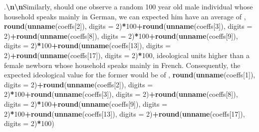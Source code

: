 \documentclass[
]{book}
\newenvironment{Shaded}{\begin{snugshade}}{\end{snugshade}}
\newcommand{\AttributeTok}[1]{\textcolor[rgb]{0.13,0.29,0.53}{#1}}
\newcommand{\DecValTok}[1]{\textcolor[rgb]{0.00,0.00,0.81}{#1}}
\newcommand{\FunctionTok}[1]{\textcolor[rgb]{0.13,0.29,0.53}{\textbf{#1}}}
\newcommand{\NormalTok}[1]{#1}
\newcommand{\SpecialCharTok}[1]{\textcolor[rgb]{0.81,0.36,0.00}{\textbf{#1}}}
\newcommand{\StringTok}[1]{\textcolor[rgb]{0.31,0.60,0.02}{#1}}
\begin{document}
\begin{Shaded}
\begin{Highlighting}[]
\StringTok{\textquotesingle{}.}\SpecialCharTok{\textbackslash{}n\textbackslash{}n}\StringTok{Similarly, should one observe a random 100 year old male individual whose household speaks mainly in German, we can expected him have an average of \textquotesingle{}}\NormalTok{, }\FunctionTok{round}\NormalTok{(}\FunctionTok{unname}\NormalTok{(coeffs[}\DecValTok{2}\NormalTok{]), }\AttributeTok{digits =} \DecValTok{2}\NormalTok{)}\SpecialCharTok{*}\DecValTok{100}\SpecialCharTok{+}\FunctionTok{round}\NormalTok{(}\FunctionTok{unname}\NormalTok{(coeffs[}\DecValTok{3}\NormalTok{]), }\AttributeTok{digits =} \DecValTok{2}\NormalTok{)}\SpecialCharTok{+}\FunctionTok{round}\NormalTok{(}\FunctionTok{unname}\NormalTok{(coeffs[}\DecValTok{8}\NormalTok{]), }\AttributeTok{digits =} \DecValTok{2}\NormalTok{)}\SpecialCharTok{*}\DecValTok{100}\SpecialCharTok{+}\FunctionTok{round}\NormalTok{(}\FunctionTok{unname}\NormalTok{(coeffs[}\DecValTok{9}\NormalTok{]), }\AttributeTok{digits =} \DecValTok{2}\NormalTok{)}\SpecialCharTok{*}\DecValTok{100}\SpecialCharTok{+}\FunctionTok{round}\NormalTok{(}\FunctionTok{unname}\NormalTok{(coeffs[}\DecValTok{13}\NormalTok{]), }\AttributeTok{digits =} \DecValTok{2}\NormalTok{)}\SpecialCharTok{+}\FunctionTok{round}\NormalTok{(}\FunctionTok{unname}\NormalTok{(coeffs[}\DecValTok{17}\NormalTok{]), }\AttributeTok{digits =} \DecValTok{2}\NormalTok{)}\SpecialCharTok{*}\DecValTok{100}\NormalTok{, }\StringTok{\textquotesingle{} ideological units higher than a female newborn whose household speaks mainly in French. Consequently, the expected ideological value for the former would be of \textquotesingle{}}\NormalTok{, }\FunctionTok{round}\NormalTok{(}\FunctionTok{unname}\NormalTok{(coeffs[}\DecValTok{1}\NormalTok{]), }\AttributeTok{digits =} \DecValTok{2}\NormalTok{)}\SpecialCharTok{+}\FunctionTok{round}\NormalTok{(}\FunctionTok{unname}\NormalTok{(coeffs[}\DecValTok{2}\NormalTok{]), }\AttributeTok{digits =} \DecValTok{2}\NormalTok{)}\SpecialCharTok{*}\DecValTok{100}\SpecialCharTok{+}\FunctionTok{round}\NormalTok{(}\FunctionTok{unname}\NormalTok{(coeffs[}\DecValTok{3}\NormalTok{]), }\AttributeTok{digits =} \DecValTok{2}\NormalTok{)}\SpecialCharTok{+}\FunctionTok{round}\NormalTok{(}\FunctionTok{unname}\NormalTok{(coeffs[}\DecValTok{8}\NormalTok{]), }\AttributeTok{digits =} \DecValTok{2}\NormalTok{)}\SpecialCharTok{*}\DecValTok{100}\SpecialCharTok{+}\FunctionTok{round}\NormalTok{(}\FunctionTok{unname}\NormalTok{(coeffs[}\DecValTok{9}\NormalTok{]), }\AttributeTok{digits =} \DecValTok{2}\NormalTok{)}\SpecialCharTok{*}\DecValTok{100}\SpecialCharTok{+}\FunctionTok{round}\NormalTok{(}\FunctionTok{unname}\NormalTok{(coeffs[}\DecValTok{13}\NormalTok{]), }\AttributeTok{digits =} \DecValTok{2}\NormalTok{)}\SpecialCharTok{+}\FunctionTok{round}\NormalTok{(}\FunctionTok{unname}\NormalTok{(coeffs[}\DecValTok{17}\NormalTok{]), }\AttributeTok{digits =} \DecValTok{2}\NormalTok{)}\SpecialCharTok{*}\DecValTok{100}\NormalTok{)}
\end{Highlighting}
\end{Shaded}
\end{document}
